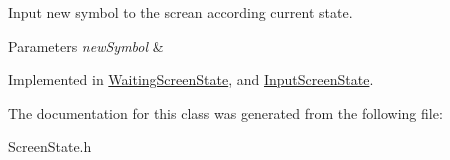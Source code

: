 Input new symbol to the screan according current state. 


\begin{DoxyParams}{Parameters}
{\em new\+Symbol} & \\
\hline
\end{DoxyParams}


Implemented in \hyperlink{class_waiting_screen_state_ac22e314bd11df4ba4d5480da022f5862}{Waiting\+Screen\+State}, and \hyperlink{class_input_screen_state_a2189d602f5fe02660488a5a49c4c76f8}{Input\+Screen\+State}.



The documentation for this class was generated from the following file\+:\begin{DoxyCompactItemize}
\item 
Screen\+State.\+h\end{DoxyCompactItemize}
